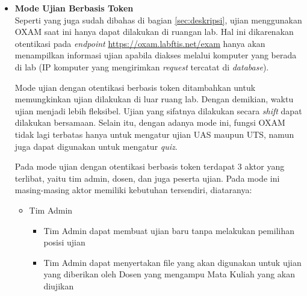 \documentclass[a4paper,twoside]{article}
\begin{document}
\begin{enumerate}
\begin{itemize}
\begin{itemize}
            	    \vspace{0.3cm}
            	    
            	    \item \textbf{Mode Ujian Berbasis Token}\\
            	    \label{mode-ujian-basis-token}
            		Seperti yang juga sudah dibahas di bagian \ref{sec:deskripsi}, ujian menggunakan OXAM saat ini hanya dapat dilakukan di ruangan lab. Hal ini dikarenakan otentikasi pada \textit{endpoint} \url{https://oxam.labftis.net/exam} hanya akan menampilkan informasi ujian apabila diakses melalui komputer yang berada di lab (IP komputer yang mengirimkan \textit{request} tercatat di \textit{database}).
            		
            		Mode ujian dengan otentikasi berbasis token ditambahkan untuk memungkinkan ujian dilakukan di luar ruang lab. Dengan demikian, waktu ujian menjadi lebih fleksibel. Ujian yang sifatnya dilakukan secara \textit{shift} dapat dilakukan bersamaan. Selain itu, dengan adanya mode ini, fungsi OXAM tidak lagi terbatas hanya untuk mengatur ujian UAS maupun UTS, namun juga dapat digunakan untuk mengatur \textit{quiz}.
            		
            		Pada mode ujian dengan otentikasi berbasis token terdapat 3 aktor yang terlibat, yaitu tim admin, dosen, dan juga peserta ujian. Pada mode ini masing-masing aktor memiliki kebutuhan tersendiri, diataranya:
            		\begin{itemize}
            		    \item Tim Admin
            		    \begin{itemize}
            		        \item Tim Admin dapat membuat ujian baru tanpa melakukan pemilihan posisi ujian
            		        \item Tim Admin dapat menyertakan file yang akan digunakan untuk ujian yang diberikan oleh Dosen yang mengampu Mata Kuliah yang akan diujikan
            		    \end{itemize}
            		    

\end{itemize}
\end{itemize}
\end{itemize}
\end{enumerate}
\end{document}
